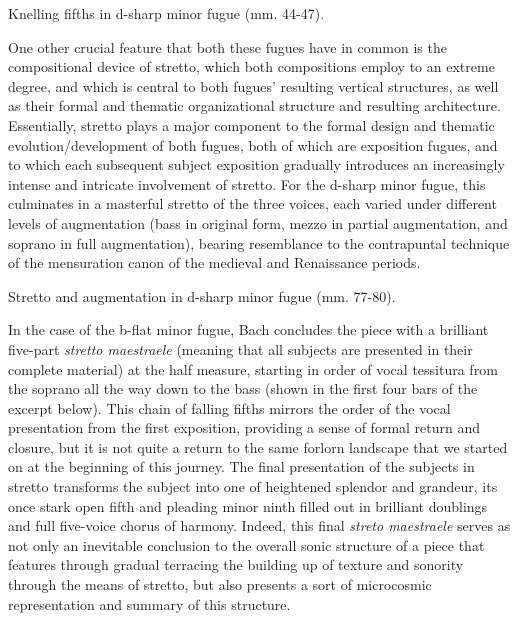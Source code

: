 \begin{Example}[H]
\vspace{1.5em}
    \centering
    \caption{ Knelling fifths in d-sharp minor fugue (mm. 44-47). }
\end{Example}    
    One other crucial feature that both these fugues have in common is the
compositional device of stretto, which both compositions employ to an
extreme degree, and which is central to both fugues' resulting vertical
structures, as well as their formal and thematic organizational
structure and resulting architecture. Essentially, stretto plays a major
component to the formal design and thematic evolution/development of
both fugues, both of which are exposition fugues, and to which each
subsequent subject exposition gradually introduces an increasingly
intense and intricate involvement of stretto. For the d-sharp minor
fugue, this culminates in a masterful stretto of the three voices, each
varied under different levels of augmentation (bass in original form,
mezzo in partial augmentation, and soprano in full augmentation),
bearing resemblance to the contrapuntal technique of the mensuration
canon of the medieval and Renaissance periods.



\begin{Example}[H]
\vspace{1.5em}
    \centering
    \caption{ Stretto and augmentation in d-sharp minor fugue (mm. 77-80). }
\end{Example}    
    In the case of the b-flat minor fugue, Bach concludes the piece with a
brilliant five-part \emph{stretto maestraele} (meaning that all subjects
are presented in their complete material) at the half measure, starting
in order of vocal tessitura from the soprano all the way down to the
bass (shown in the first four bars of the excerpt below). This chain of
falling fifths mirrors the order of the vocal presentation from the
first exposition, providing a sense of formal return and closure, but it
is not quite a return to the same forlorn landscape that we started on
at the beginning of this journey. The final presentation of the subjects
in stretto transforms the subject into one of heightened splendor and
grandeur, its once stark open fifth and pleading minor ninth filled out
in brilliant doublings and full five-voice chorus of harmony. Indeed,
this final \emph{streto maestraele} serves as not only an inevitable
conclusion to the overall sonic structure of a piece that features
through gradual terracing the building up of texture and sonority
through the means of stretto, but also presents a sort of microcosmic
representation and summary of this structure.

